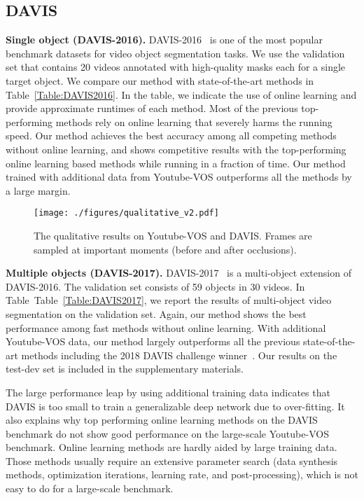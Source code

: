 \documentclass[10pt,twocolumn,letterpaper]{article}
\newcommand{\Tref}[1]{Table~\ref{#1}}
\renewcommand{\paragraph}[1]{\vspace{1mm}\noindent\textbf{#1}}
\begin{document}
\subsection{DAVIS} 
\paragraph{Single object (DAVIS-2016).} 
DAVIS-2016~\cite{Perazzi2016} is one of the most popular benchmark datasets for video object segmentation tasks. We use the validation set that contains 20 videos annotated with high-quality masks each for a single target object. 
We compare our method with state-of-the-art methods in \Tref{Table:DAVIS2016}. 
In the table, we indicate the use of online learning and provide approximate runtimes of each method. 
Most of the previous top-performing methods rely on online learning that severely harms the running speed.
Our method achieves the best accuracy among all competing methods without online learning, and shows competitive results with the top-performing online learning based methods while running in a fraction of time. 
Our method trained with additional data from Youtube-VOS outperforms all the methods by a large margin. 


\begin{figure*}
\centering
\texttt{[image: ./figures/qualitative\_v2.pdf]}
\caption{The qualitative results on Youtube-VOS and DAVIS. Frames are sampled at important moments (\eg before and after occlusions).}
\label{Fig:qualitative}
\end{figure*}





\paragraph{Multiple objects (DAVIS-2017).}  
DAVIS-2017~\cite{Pont-Tuset_arXiv_2017} is a multi-object extension of DAVIS-2016. 
The validation set consists of 59 objects in 30 videos.
In Table~\Tref{Table:DAVIS2017}, we report the results of multi-object video segmentation on the validation set. 
Again, our method shows the best performance among fast methods without online learning.
With additional Youtube-VOS data, our method largely outperforms all the previous state-of-the-art methods including the 2018 DAVIS challenge winner~\cite{luiten2018premvos}. 
Our results on the test-dev set is included in the supplementary materials.

The large performance leap by using additional training data indicates that DAVIS is too small to train a generalizable deep network due to over-fitting. 
It also explains why top performing online learning methods on the DAVIS benchmark do not show good performance on the large-scale Youtube-VOS benchmark. 
Online learning methods are hardly aided by large training data. 
Those methods usually require an extensive parameter search (\eg data synthesis methods, optimization iterations, learning rate, and post-processing), which is not easy to do for a large-scale benchmark.
\end{document}
